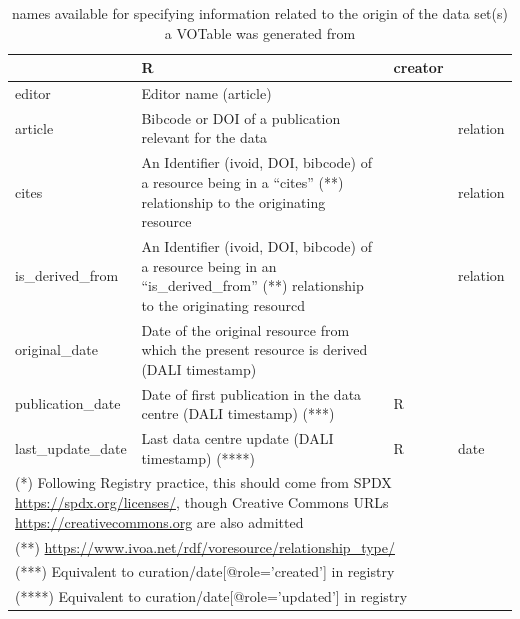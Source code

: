 \documentclass[11pt,a4paper]{ivoa}
\begin{document}
\begin{table}
{\begin{tabular}{|l|>{\raggedright}p{6cm}|l|l|}
                   & R & creator\\ \hline
editor             & Editor name (article)&  & \\ \hline
article            & Bibcode or DOI of a publication relevant for the data & & relation\\ \hline
cites              & An Identifier (ivoid, DOI, bibcode) of a resource
                     being in a ``cites'' (**) relationship to the
                     originating resource& & relation\\ \hline
is\_derived\_from  & An Identifier (ivoid, DOI, bibcode) of a resource
                     being in an ``is\_derived\_from'' (**) relationship
                     to the originating resourcd& & relation\\ \hline
%
original\_date     & Date of the original resource from which the present resource is derived (DALI timestamp) &    &  \\ \hline
publication\_date  & Date of first publication in the data centre  (DALI timestamp) (***) &  R &  \\ \hline
last\_update\_date & Last data centre update (DALI timestamp) (****) & R & date\\ \hline
\multicolumn{4}{p{\textwidth}}{\vskip2pt\footnotesize(*) Following Registry
practice, this should come from
SPDX \url{https://spdx.org/licenses/}, though Creative Commons URLs
\url{https://creativecommons.org} are also admitted}\\
\multicolumn{4}{p{\textwidth}}{\footnotesize(**) \url{https://www.ivoa.net/rdf/voresource/relationship\_type/}}\\
\multicolumn{4}{p{\textwidth}}{\footnotesize(***) Equivalent to curation/date[@role='created'] in registry}\\
\multicolumn{4}{p{\textwidth}}{\footnotesize(****) Equivalent to curation/date[@role='updated'] in registry}
\end{tabular}\hss}
\caption{ names available for specifying information
related to the origin of the data set(s) a VOTable was generated from}
\label{tab:origin-names}
\end{table}
\end{document}
